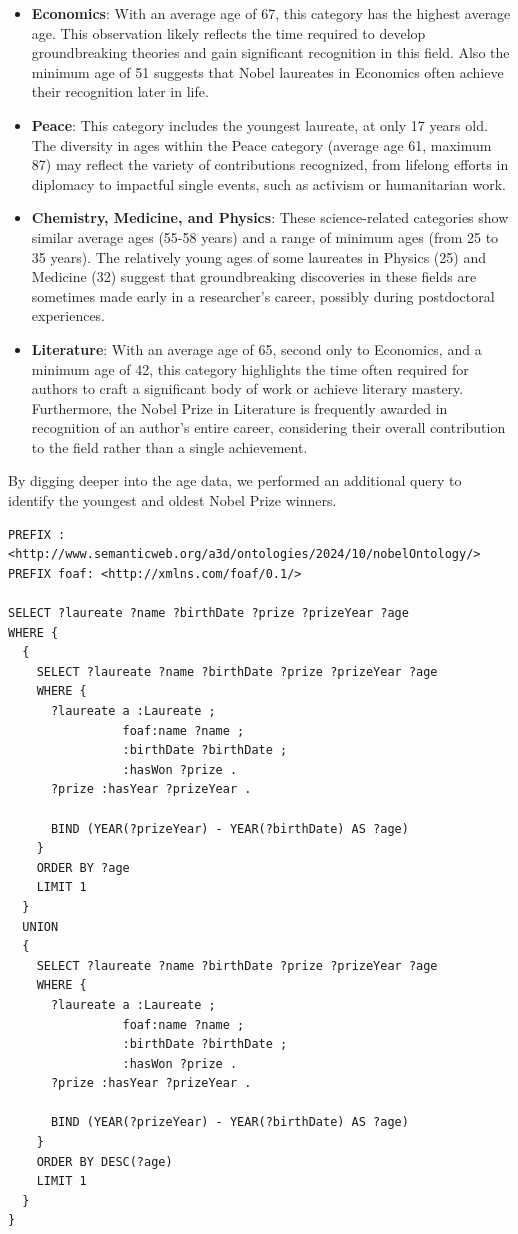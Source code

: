 \documentclass{article}
\begin{document}
\begin{itemize}
    \item \textbf{Economics}: With an average age of 67, this category has the highest average age.
    This observation likely reflects the time required to develop groundbreaking theories and gain significant
    recognition in this field. Also the minimum age of 51 suggests that Nobel laureates in Economics often
    achieve their recognition later in life.
    
    \item \textbf{Peace}: This category includes the youngest laureate, at only 17 years old.
    The diversity in ages within the Peace category (average age 61, maximum 87) may reflect the variety of
    contributions recognized, from lifelong efforts in diplomacy to impactful single events, such as activism
    or humanitarian work.
    
    \item \textbf{Chemistry, Medicine, and Physics}: These science-related categories show similar average ages
    (55-58 years) and a range of minimum ages (from 25 to 35 years). The relatively young ages of some laureates
    in Physics (25) and Medicine (32) suggest that groundbreaking discoveries in these fields are sometimes made
    early in a researcher's career, possibly during postdoctoral experiences.
    
    \item \textbf{Literature}: With an average age of 65, second only to Economics, and a minimum age of 42, this
    category highlights the time often required for authors to craft a significant body of work or achieve literary
    mastery. Furthermore, the Nobel Prize in Literature is frequently awarded in recognition of an author's
    entire career, considering their overall contribution to the field rather than a single achievement.
\end{itemize}

By digging deeper into the age data, we performed an additional query to identify the youngest and oldest
Nobel Prize winners. 

\begin{lstlisting}
PREFIX : <http://www.semanticweb.org/a3d/ontologies/2024/10/nobelOntology/>
PREFIX foaf: <http://xmlns.com/foaf/0.1/>

SELECT ?laureate ?name ?birthDate ?prize ?prizeYear ?age
WHERE {
  {
    SELECT ?laureate ?name ?birthDate ?prize ?prizeYear ?age
    WHERE {
      ?laureate a :Laureate ;
                foaf:name ?name ;
                :birthDate ?birthDate ;
                :hasWon ?prize .
      ?prize :hasYear ?prizeYear .

      BIND (YEAR(?prizeYear) - YEAR(?birthDate) AS ?age)
    }
    ORDER BY ?age
    LIMIT 1
  }
  UNION
  {
    SELECT ?laureate ?name ?birthDate ?prize ?prizeYear ?age
    WHERE {
      ?laureate a :Laureate ;
                foaf:name ?name ;
                :birthDate ?birthDate ;
                :hasWon ?prize .
      ?prize :hasYear ?prizeYear .

      BIND (YEAR(?prizeYear) - YEAR(?birthDate) AS ?age)
    }
    ORDER BY DESC(?age)
    LIMIT 1
  }
}
\end{lstlisting}
\end{document}
